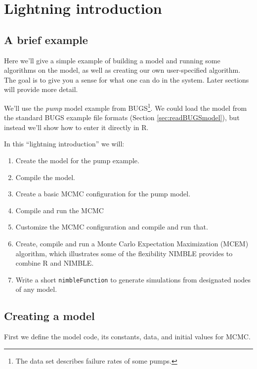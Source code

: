 \documentclass[12pt,oneside]{book}\usepackage[]{graphicx}\usepackage[]{color}
\def\cd#1{\texttt{#1}}
\def\nm#1{\textit{#1}}
\begin{document}
\chapter{Lightning introduction}
\label{cha:intro}

\section{A brief example}
\label{sec:brief-example}

Here we'll give a simple example of building a model and running some algorithms on the model, as well as creating our own user-specified algorithm. The goal is to give you a sense for what one can do in the system. Later sections will provide more detail.

We'll use the \nm{pump} model example from BUGS\footnote{The data set
  describes failure rates of some pumps.}.  We could load the model
from the standard BUGS example file formats (Section \ref{sec:readBUGSmodel}), but instead we'll show
how to enter it directly in R.

In this ``lightning introduction'' we will:

\begin{enumerate}
\item Create the model for the pump example.
\item Compile the model.
\item Create a basic MCMC configuration for the pump model.
\item Compile and run the MCMC
\item Customize the MCMC configuration and compile and run that.
\item Create, compile and run a Monte Carlo Expectation Maximization (MCEM)
  algorithm, which illustrates some of the flexibility NIMBLE
  provides to combine R and NIMBLE.
\item Write a short \cd{nimbleFunction} to generate simulations from
  designated nodes of any  model.
\end{enumerate}


\section{Creating a model}
\label{sec:creating-model}
First we define the model code, its constants, data, and initial
values for MCMC.
\end{document}
